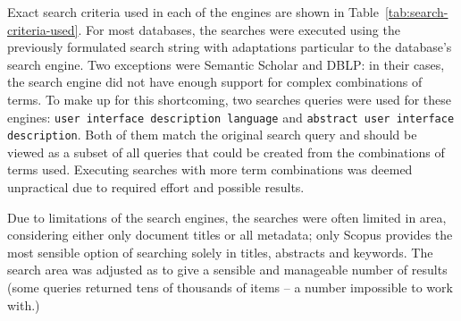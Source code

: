 Exact search criteria used in each of the engines are shown in Table~\ref{tab:search-criteria-used}.
For most databases, the searches were executed using the previously formulated search string with adaptations particular to the database's search engine.
Two exceptions were Semantic Scholar and DBLP: in their cases, the search engine did not have enough support for complex combinations of terms.
To make up for this shortcoming, two searches queries were used for these engines: \verb|user interface description language| and \verb|abstract user interface description|.
Both of them match the original search query and should be viewed as a subset of all queries that could be created from the combinations of terms used.
Executing searches with more term combinations was deemed unpractical due to required effort and possible results.

Due to limitations of the search engines, the searches were often limited in area, considering either only document titles or all metadata;
only Scopus provides the most sensible option of searching solely in titles, abstracts and keywords.
The search area was adjusted as to give a sensible and manageable number of results (some queries returned tens of thousands of items -- a number impossible to work with.)


